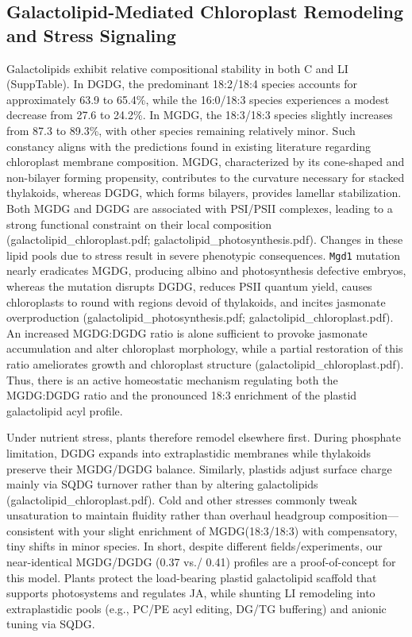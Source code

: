 \documentclass[10pt,letterpaper]{article}
\begin{document}
\subsection*{Galactolipid-Mediated Chloroplast Remodeling and Stress Signaling}
Galactolipids exhibit relative compositional stability in both C and LI (SuppTable). In DGDG, the predominant 18:2/18:4 species accounts for approximately 63.9 to 65.4\%, while the 16:0/18:3 species experiences a modest decrease from 27.6 to 24.2\%. In MGDG, the 18:3/18:3 species slightly increases from 87.3 to 89.3\%, with other species remaining relatively minor. Such constancy aligns with the predictions found in existing literature regarding chloroplast membrane composition. MGDG, characterized by its cone-shaped and non-bilayer forming propensity, contributes to the curvature necessary for stacked thylakoids, whereas DGDG, which forms bilayers, provides lamellar stabilization. Both MGDG and DGDG are associated with PSI/PSII complexes, leading to a strong functional constraint on their local composition (galactolipid\_chloroplast.pdf; galactolipid\_photosynthesis.pdf). Changes in these lipid pools due to stress result in severe phenotypic consequences. \texttt{Mgd1} mutation nearly eradicates MGDG, producing albino and photosynthesis defective embryos, whereas the  mutation disrupts DGDG, reduces PSII quantum yield, causes chloroplasts to round with regions devoid of thylakoids, and incites jasmonate overproduction (galactolipid\_photosynthesis.pdf; galactolipid\_chloroplast.pdf). An increased MGDG:DGDG ratio is alone sufficient to provoke jasmonate accumulation and alter chloroplast morphology, while a partial restoration of this ratio ameliorates growth and chloroplast structure (galactolipid\_chloroplast.pdf). Thus, there is an active homeostatic mechanism regulating both the MGDG:DGDG ratio and the pronounced 18:3 enrichment of the plastid galactolipid acyl profile.

Under nutrient stress, plants therefore remodel elsewhere first. During phosphate limitation, DGDG expands into extraplastidic membranes while thylakoids preserve their MGDG/DGDG balance. Similarly, plastids adjust surface charge mainly via SQDG turnover rather than by altering galactolipids (galactolipid\_chloroplast.pdf). Cold and other stresses commonly tweak unsaturation to maintain fluidity rather than overhaul headgroup composition—consistent with your slight enrichment of MGDG(18:3/18:3) with compensatory, tiny shifts in minor species. In short, despite different fields/experiments, our near-identical MGDG/DGDG (0.37 vs./ 0.41) profiles are a proof-of-concept for this model. Plants protect the load-bearing plastid galactolipid scaffold that supports photosystems and regulates JA, while shunting LI remodeling into extraplastidic pools (e.g., PC/PE acyl editing, DG/TG buffering) and anionic tuning via SQDG.
\end{document}
